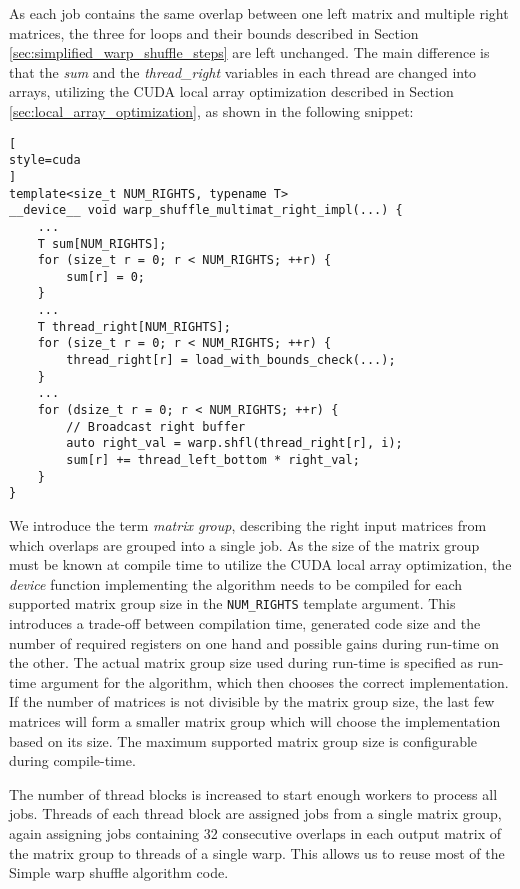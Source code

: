 As each job contains the same overlap between one left matrix and multiple right matrices, the three for loops and their bounds described in Section \ref{sec:simplified_warp_shuffle_steps} are left unchanged. The main difference is that the \textit{sum} and the \textit{thread\_right} variables in each thread are changed into arrays, utilizing the CUDA local array optimization described in Section \ref{sec:local_array_optimization}, as shown in the following snippet:

\begin{lstlisting}[
style=cuda
]
template<size_t NUM_RIGHTS, typename T>
__device__ void warp_shuffle_multimat_right_impl(...) {
	...
	T sum[NUM_RIGHTS];
	for (size_t r = 0; r < NUM_RIGHTS; ++r) {
		sum[r] = 0;
	}
	...
	T thread_right[NUM_RIGHTS];
	for (size_t r = 0; r < NUM_RIGHTS; ++r) {
		thread_right[r] = load_with_bounds_check(...);
	}
	...
	for (dsize_t r = 0; r < NUM_RIGHTS; ++r) {
		// Broadcast right buffer
		auto right_val = warp.shfl(thread_right[r], i);
		sum[r] += thread_left_bottom * right_val;
	}
}
\end{lstlisting}

We introduce the term \textit{matrix group}, describing the right input matrices from which overlaps are grouped into a single job. As the size of the matrix group must be known at compile time to utilize the CUDA local array optimization, the \textit{device} function implementing the algorithm needs to be compiled for each supported matrix group size in the \texttt{NUM\_RIGHTS} template argument. This introduces a trade-off between compilation time, generated code size and the number of required registers on one hand and possible gains during run-time on the other. The actual matrix group size used during run-time is specified as run-time argument for the algorithm, which then chooses the correct implementation. If the number of matrices is not divisible by the matrix group size, the last few matrices will form a smaller matrix group which will choose the implementation based on its size. The maximum supported matrix group size is configurable during compile-time.

The number of thread blocks is increased to start enough workers to process all jobs. Threads of each thread block are assigned jobs from a single matrix group, again assigning jobs containing 32 consecutive overlaps in each output matrix of the matrix group to threads of a single warp. This allows us to reuse most of the Simple warp shuffle algorithm code.

